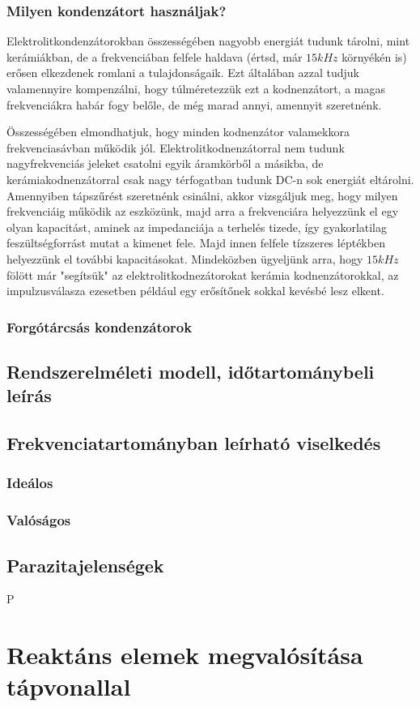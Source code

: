 \documentclass[12pt,a4paper]{article}
\begin{document}
\subsubsection{Milyen kondenzátort használjak?}
Elektrolitkondenzátorokban összességében nagyobb energiát tudunk tárolni, mint kerámiákban, de a frekvenciában felfele haldava (értsd, már \(15 kHz\) környékén is) erősen elkezdenek romlani a tulajdonságaik. Ezt általában azzal tudjuk valamennyire kompenzálni, hogy túlméretezzük ezt a kodnenzátort, a magas frekvenciákra habár fogy belőle, de még marad annyi, amennyit szeretnénk.
\par Összességében elmondhatjuk, hogy minden kodnenzátor valamekkora frekvenciasávban működik jól. Elektrolitkodnenzátorral nem tudunk nagyfrekvenciás jeleket csatolni egyik áramkörből a másikba, de kerámiakodnenzátorral csak nagy térfogatban tudunk DC-n sok energiát eltárolni. Amennyiben tápszűrést szeretnénk csinálni, akkor vizsgáljuk meg, hogy milyen frekvenciáig működik az eszközünk, majd arra a frekvenciára helyezzünk el egy olyan kapacitást, aminek az impedanciája a terhelés tizede,
így gyakorlatilag feszültségforrást mutat a kimenet fele. Majd innen felfele tízszeres léptékben helyezzünk el további kapacitásokat. Mindeközben ügyeljünk arra, hogy \(15 kHz\) fölött már "segítsük" az elektrolitkodnezátorokat kerámia kodnenzátorokkal, az impulzusválasza ezesetben például egy erősítőnek sokkal kevésbé lesz elkent.

\subsubsection{Forgótárcsás kondenzátorok}
\subsection{Rendszerelméleti modell, időtartománybeli leírás}
\subsection{Frekvenciatartományban leírható viselkedés}
\subsubsection{Ideálos}
\subsubsection{Valóságos}
\subsection{Parazitajelenségek}
P

\section{Reaktáns elemek megvalósítása tápvonallal}
\end{document}
